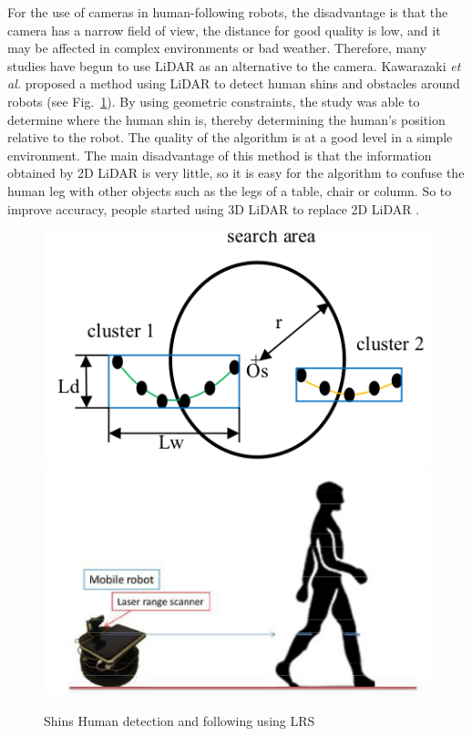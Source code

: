 For the use of cameras in human-following robots, the disadvantage is that the camera has a narrow field of view, the distance for good quality is low, and it may be affected in complex environments or bad weather. Therefore, many studies have begun to use LiDAR as an alternative to the camera. Kawarazaki {\it et al.} \cite{hfr_lrs} proposed a method using LiDAR to detect human shins and obstacles around robots (see Fig.~\ref{Chap2:Fig2}). By using geometric constraints, the study was able to determine where the human shin is, thereby determining the human's position relative to the robot. The quality of the algorithm is at a good level in a simple environment. The main disadvantage of this method is that the information obtained by 2D LiDAR  is very little, so it is easy for the algorithm to confuse the human leg with other objects such as the legs of a table, chair or column. So to improve accuracy, people started using 3D LiDAR  to replace 2D LiDAR .\\

\begin{figure}[h]
    \centering
    \begin{minipage}{\columnwidth}
        \includegraphics[width=0.48\linewidth]{figures/chap2_fig/shins_human.png}
        \hfill
        \includegraphics[width=0.48\linewidth]{figures/chap2_fig/shinshuman.png}
        \caption{Shins Human detection and following using LRS\cite{hfr_lrs}}
        \label{Chap2:Fig2}
    \end{minipage}\hfill
\end{figure}

